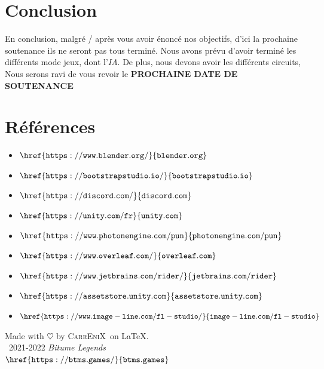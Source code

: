 \documentclass[12pt,a4paper]{article}
\newcommand{\btmlgs}{\textsl{Bitume Legends}}
\newcommand{\CEX}{\textsc{CarrEniX}}
\begin{document}
\clearpage

\section*{Conclusion}
    En conclusion, malgré / après vous avoir énoncé nos objectifs, d'ici 
    la prochaine soutenance ils ne seront pas tous terminé. Nous avons
    prévu d'avoir terminé les différents mode jeux, dont l'\textit{IA}. 
    De plus, nous devons avoir les différents circuits, 
    Nous serons ravi de vous revoir le \textbf{PROCHAINE DATE DE SOUTENANCE}

\section*{Références}
    \begin{itemize}
        \item \(\mathtt{\href{https://www.blender.org/}{blender.org}}\)
        \item \(\mathtt{\href{https://bootstrapstudio.io/}{bootstrapstudio.io}}\)
        \item \(\mathtt{\href{https://discord.com/}{discord.com}}\)
        \item \(\mathtt{\href{https://unity.com/fr}{unity.com}}\)
        \item \(\mathtt{\href{https://www.photonengine.com/pun}{photonengine.com/pun}}\)
        \item \(\mathtt{\href{https://www.overleaf.com/}{overleaf.com}}\)
        \item \(\mathtt{\href{https://www.jetbrains.com/rider/}{jetbrains.com/rider}}\)
        \item \(\mathtt{\href{https://assetstore.unity.com}{assetstore.unity.com}}\)
        \item \(\mathtt{\href{https://www.image-line.com/fl-studio/}{image-line.com/fl-studio}}\)\\[9cm]
    \end{itemize}

\begin{center}
    Made with $\heartsuit$ by \CEX\, on \LaTeX.\\
    \textcopyright\, 2021-2022 \btmlgs\\
    \(\mathtt{\href{https://btms.games/}{btms.games}}\)
\end{center}

\clearpage
{}
\end{document}
